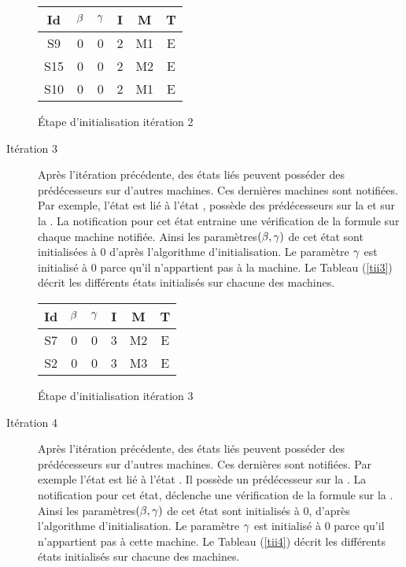 \begin{Exemple}
\begin{description}
\begin{tableth}
	\centering
	\begin{tabular}{|*{6}{c|}}
		\hline
		Id	& $\beta{}$	&$\gamma{}$&	I&	M&	T\\
		\hline
		S9&	0&	0&	2&	M1&	E\\
		\hline
		S15&0&	0&	2&	M2&	E\\
		\hline
		S10&0&	0&	2&	M1&	E\\
		\hline
	\end{tabular}
	\caption{Étape d'initialisation itération 2}\label{tii2}
\end{tableth}
	\item[Itération 3]
Après l'itération précédente, des états liés peuvent posséder des prédécesseurs sur d'autres machines. Ces dernières machines  sont notifiées. Par exemple, l'état  est lié à l'état ,  possède des prédécesseurs sur la \mtwo{} et sur la \mtree{}. La notification pour cet état entraine une vérification de la formule sur chaque machine notifiée. Ainsi les paramètres$(\beta{}, \gamma{})$ de cet état sont initialisées à $0$ d'après l'algorithme d'initialisation. Le paramètre $\gamma{}$ est initialisé à $0$  parce qu'il n'appartient pas à la machine. Le Tableau (\ref{tii3}) décrit les différents états initialisés sur  chacune des machines.    		 
\begin{tableth}
	\centering
	\begin{tabular}{|*{6}{c|}}
		\hline
		Id	& $\beta{}$	&$\gamma{}$&	I&	M&	T\\
		\hline
		S7&	0&	0&	3&	M2&	E\\
		\hline
		S2&	0&	0&	3&	M3&	E\\
		\hline
	\end{tabular}
	\caption{Étape d'initialisation itération 3}\label{tii3}
\end{tableth}
	\item[Itération 4] Après l'itération précédente, des états liés peuvent posséder des prédécesseurs sur d'autres machines. Ces dernières sont notifiées. Par exemple l'état  est lié à l'état . Il possède un prédécesseur sur la \mtwo{}. La notification pour cet état, déclenche une vérification de la formule sur la \mtwo{}. Ainsi les paramètres$(\beta{}, \gamma{})$ de cet état sont initialisés à $0$, d'après l'algorithme d'initialisation. Le paramètre $\gamma{}$ est initialisé à $0$  parce qu'il n'appartient pas à cette machine. Le Tableau (\ref{tii4}) décrit les différents états initialisés sur  chacune des machines. 			  

\end{description}
\end{Exemple}

